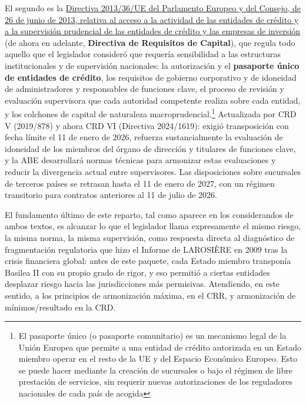 \documentclass[10pt,a4paper]{article}
\begin{document}
El segundo es la \href{https://www.boe.es/buscar/doc.php?id=DOUE-L-2013-81262}{Directiva 2013/36/UE del Parlamento Europeo y del Consejo, de 26 de junio de 2013, relativa al acceso a la actividad de las entidades de crédito y a la supervisión prudencial de las entidades de crédito y las empresas de inversión} (de ahora en adelante, \textbf{Directiva de Requisitos de Capital}), que regula todo aquello que el legislador consideró que requería sensibilidad a las estructuras institucionales y de supervisión nacionales: la autorización y el \textbf{pasaporte único de entidades de crédito}, los requisitos de gobierno corporativo y de idoneidad de administradores y responsables de funciones clave, el proceso de revisión y evaluación supervisora que cada autoridad competente realiza sobre cada entidad, y los colchones de capital de naturaleza macroprudencial.\footnote{%
    El pasaporte único (o pasaporte comunitario) es un mecanismo legal de la Unión Europea que permite a una entidad de crédito autorizada en un Estado miembro operar en el resto de la UE y del Espacio Económico Europeo. Esto se puede hacer mediante la creación de sucursales o bajo el régimen de libre prestación de servicios, sin requerir nuevas autorizaciones de los reguladores nacionales de cada país de acogida
} Actualizada por CRD V (2019/878) y ahora CRD VI (Directiva 2024/1619): exigió transposición con fecha límite el 11 de enero de 2026, refuerza sustancialmente la evaluación de idoneidad de los miembros del órgano de dirección y titulares de funciones clave, y la ABE desarrollará normas técnicas para armonizar estas evaluaciones y reducir la divergencia actual entre supervisores. Las disposiciones sobre sucursales de terceros países se retrasan hasta el 11 de enero de 2027, con un régimen transitorio para contratos anteriores al 11 de julio de 2026. 

El fundamento último de este reparto, tal como aparece en los considerandos de ambos textos, es alcanzar lo que el legislador llama expresamente el mismo riesgo, la misma norma, la misma supervisión, como respuesta directa al diagnóstico de fragmentación regulatoria que hizo el Informe de LAROSIÈRE en 2009 tras la crisis financiera global: antes de este paquete, cada Estado miembro transponía Basilea II con su propio grado de rigor, y eso permitió a ciertas entidades desplazar riesgo hacia las jurisdicciones más permisivas. Atendiendo, en este sentido, a los principios de armonización máxima, en el CRR, y armonización de mínimos/resultado en la CRD.
\end{document}
